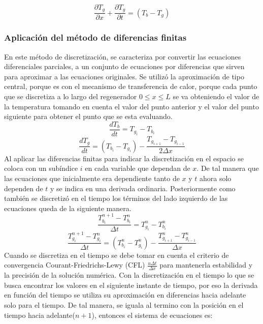 \documentclass[12pt,letterpaper,final]{article}%
\begin{document}
 \begin{equation}
 	\frac{\partial T_g}{\partial x} + \frac{\partial T_g}{\partial t} = (T_b - T_g) 
 \end{equation}
\subsubsection{Aplicación del método de diferencias finitas}
En este método de discretización, se caracteriza por convertir las ecuaciones diferenciales parciales, a un conjunto de ecuaciones por diferencias que sirven para aproximar a las ecuaciones originales. Se utilizó la aproximación de tipo central, porque es con el mecanismo de transferencia de calor, porque cada punto que se discretiza a lo largo del regenerador $0\leq x\leq L$ se va obteniendo el valor de la temperatura tomando en cuenta el valor del punto anterior y el valor del punto siguiente para obtener el punto que se esta evaluando.
\begin{equation*}
	\frac{d T_b}{d t} = T_{g_i} - T_{b_i}
\end{equation*} 
\begin{equation*}
	\frac{d T_g}{d t} = (T_{b_i} - T_{g_i}) - \frac{T_{g_{i+1}} - T_{g_{i-1}} }{2\Delta x}   
\end{equation*}
Al aplicar las diferencias finitas para indicar la discretización en el espacio se coloca con un subíndice $i$ en cada variable que dependan de $x$. De tal manera que las ecuaciones que inicialmente era dependiente tanto de $x$ y $t$ ahora solo dependen de $t$ y se indica en una derivada ordinaria.
\newline
Posteriormente como también se discretizó en el tiempo los términos del lado izquierdo de las ecuaciones queda de la siguiente manera.
\begin{equation*}
	\frac{T_{b_i}^{n + 1} - T_{b_i}^{n}  }{\Delta t} = T_{g_i}^n - T_{b_i}^n
\end{equation*} 
\begin{equation*}
	\frac{ T_{g_i}^{n + 1} - T_{g_i}^{n}   }{\Delta t} = (T_{b_i}^n - T_{g_i}^n) - \frac{T_{g_{i+1}}^n - T_{g_{i-1}}^n }{\Delta x}   
\end{equation*}
 Cuando se discretiza en el tiempo se debe tomar en cuenta el criterio de convergencia Courant-Friedrichs-Lewy (CFL) \cite{ZillCullen2008} $ \frac{u\Delta t}{\Delta x}$ para mantenerla estabilidad y la precisión de la solución numérica. Con la discretización en el tiempo lo que se busca encontrar los valores en el siguiente instante de tiempo, por eso la derivada en función del tiempo se utiliza su aproximación en diferencias hacia adelante solo para el tiempo.
 \newline
 De tal manera, se iguala al termino con la posición en el tiempo hacia adelante($n+1$), entonces el sistema de ecuaciones es:
 
\end{document}
